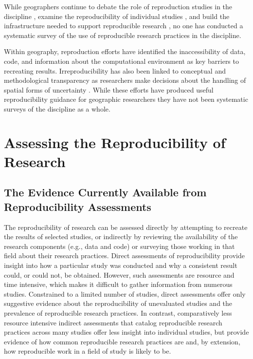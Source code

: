 \documentclass[]{interact}
\theoremstyle{plain}%
\theoremstyle{definition}
\theoremstyle{remark}
\begin{document}
While geographers continue to debate the role of reproduction studies in the discipline \citep{kedron2022replication}, examine the reproducibility of individual studies \citep{Nust_AGILE_2022, kedron2021GA}, and build the infrastructure needed to support reproducible research \citep{wilson2021}, no one has conducted a systematic survey of the use of reproducible research practices in the discipline. 

Within geography, reproduction efforts have identified the inaccessibility of data, code, and information about the computational environment as key barriers to recreating results. 
Irreproducibility has also been linked to conceptual and methodological transparency as researchers make decisions about the handling of spatial forms of uncertainty \citep{kedron2021GA}. 
While these efforts have produced useful reproducibility guidance for geographic researchers \citep{hofer2019reproducible, wilson2021} they have not been systematic surveys of the discipline as a whole. 


\section*{Assessing the Reproducibility of Research}

\subsection*{The Evidence Currently Available from Reproducibility Assessments}
The reproducibility of research can be assessed directly by attempting to recreate the results of selected studies, or indirectly by reviewing the availability of the research components (e.g., data and code) or surveying those working in that field about their research practices. 
Direct assessments of reproducibility provide insight into how a particular study was conducted and why a consistent result could, or could not, be obtained.  
However, such assessments are resource and time intensive, which makes it difficult to gather information from numerous studies. 
Constrained to a limited number of studies, direct assessments offer only suggestive evidence about the reproducibility of unevaluated studies and the prevalence of reproducible research practices. 
In contrast, comparatively less resource intensive indirect assessments that catalog reproducible research practices across many studies offer less insight into individual studies, but provide evidence of how common reproducible research practices are and, by extension, how reproducible work in a field of study is likely to be.
\end{document}
